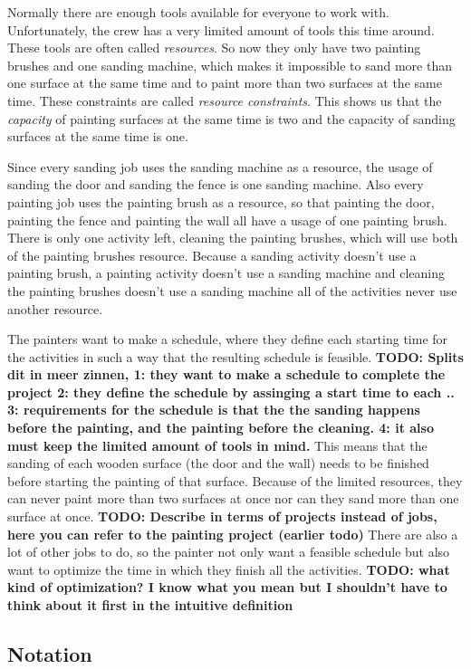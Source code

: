 \documentclass{article}
\theoremstyle{definition}
\newcommand{\TODO}[1]{{\color{red}\textbf{TODO: #1}}}
\begin{document}
Normally there are enough tools available for everyone to work with.
Unfortunately, the crew has a very limited amount of tools this time around.
These tools are often called \emph{resources}.
So now they only have two painting brushes and one sanding machine, which makes it impossible to sand more than one surface at the same time and to paint more than two surfaces at the same time.
These constraints are called \emph{resource constraints}.
This shows us that the \emph{capacity} of painting surfaces at the same time is two and the capacity of sanding surfaces at the same time is one.

Since every sanding job uses the sanding machine as a resource, the usage of sanding the door and sanding the fence is one sanding machine.
Also every painting job uses the painting brush as a resource, so that painting the door, painting the fence and painting the wall all have a usage of one painting brush.
There is only one activity left, cleaning the painting brushes, which will use both of the painting brushes resource.
Because a sanding activity doesn't use a painting brush, a painting activity doesn't use a sanding machine and cleaning the painting brushes doesn't use a sanding machine all of the activities never use another resource.

The painters want to make a schedule, where they define each starting time for the activities in such a way that the resulting schedule is feasible. \TODO{Splits dit in meer zinnen, 1: they want to make a schedule to complete the project 2: they define the schedule by assinging a start time to each .. 3: requirements for the schedule is that the the sanding happens before the painting, and the painting before the cleaning. 4: it also must keep the limited amount of tools in mind. }
This means that the sanding of each wooden surface (the door and the wall) needs to be finished before starting the painting of that surface.
Because of the limited resources, they can never paint more than two surfaces at once nor can they sand more than one surface at once. 
\TODO{Describe in terms of projects instead of jobs, here you can refer to the painting project (earlier todo)} There are also a lot of other jobs to do, so the painter not only want a feasible schedule but also want to optimize the time in which they finish all the activities. \TODO{what kind of optimization? I know what you mean but I shouldn't have to think about it first in the intuitive definition}

\subsection{Notation}
\label{text:definitions}
\end{document}
